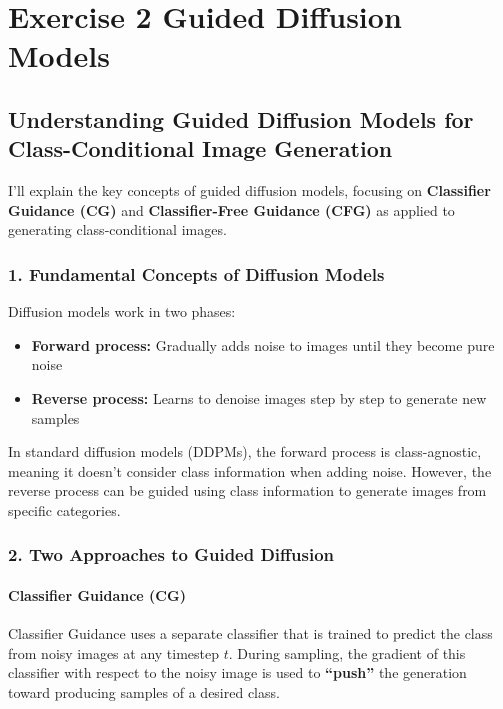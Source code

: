 \chapter{\normalsize Exercise 2 Guided Diffusion Models}

\section*{Understanding Guided Diffusion Models for Class-Conditional Image Generation}

I'll explain the key concepts of guided diffusion models, focusing on \textbf{Classifier Guidance (CG)} and \textbf{Classifier-Free Guidance (CFG)} as applied to generating class-conditional images.

\subsection*{1. Fundamental Concepts of Diffusion Models}

Diffusion models work in two phases:

\begin{itemize}
    \item \textbf{Forward process:} Gradually adds noise to images until they become pure noise
    \item \textbf{Reverse process:} Learns to denoise images step by step to generate new samples
\end{itemize}

In standard diffusion models (DDPMs), the forward process is class-agnostic, meaning it doesn't consider class information when adding noise. However, the reverse process can be guided using class information to generate images from specific categories.
\subsection*{2. Two Approaches to Guided Diffusion}

\subsubsection*{Classifier Guidance (CG)}

Classifier Guidance uses a separate classifier that is trained to predict the class from noisy images at any timestep $t$. During sampling, the gradient of this classifier with respect to the noisy image is used to \textbf{``push''} the generation toward producing samples of a desired class.

